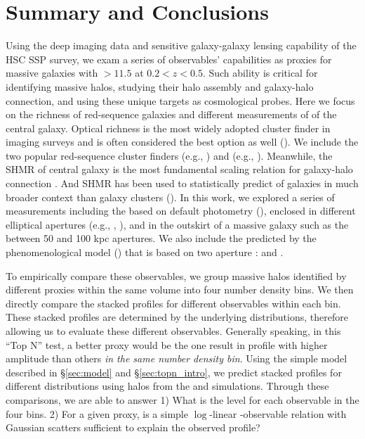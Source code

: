 \documentclass[fleqn,usenatbib,useAMS,english]{mnras}
\begin{document}
\section{Summary and Conclusions}
    \label{sec:summary}

    Using the deep imaging data and sensitive galaxy-galaxy lensing capability of the HSC SSP
    survey, we exam a series of observables' capabilities as \mvir{} proxies for massive
    galaxies with \logms{}$>11.5$ at $0.2 < z < 0.5$.
    Such ability is critical for identifying massive halos, studying their halo assembly and
    galaxy-halo connection, and using these unique targets as cosmological probes.
    Here we focus on the richness of red-sequence galaxies and different measurements of \mstar{}
    of the central galaxy.
    Optical richness is the most widely adopted cluster finder in imaging surveys and is often
    considered the best option as well (\addref{}).
    We include the two popular red-sequence cluster finders \redm{} (e.g., \addref{}) and
    \camira{} (e.g., \addref{}).
    Meanwhile, the SHMR of central galaxy is the most fundamental scaling relation for
    galaxy-halo connection \citep[e.g.,][]{Wechsler2018}.
    And SHMR has been used to statistically predict \mvir{} of galaxies in much broader
    context than galaxy clusters (\addref{}).
    In this work, we explored a series of \mstar{} measurements including the \mstar{}
    based on default \cmodel{} photometry (\mcmodel{}), \mstar{} enclosed in different
    elliptical apertures (e.g., , ), and \mstar{} in the outskirt of a
    massive galaxy such as the \mstar{} between 50 and 100 kpc apertures.
    We also include the \mvir{} predicted by the phenomenological model \asap{}
    (\citealt{Huang2020}) that is based on two aperture \mstar{}:  and \mmax{}.

    To empirically compare these observables, we group massive halos identified by different
    proxies within the same volume into four number density bins.
    We then directly compare the stacked \dsigma{} profiles for different observables within
    each bin.
    These stacked \dsigma{} profiles are determined by the underlying \mvir{} distributions,
    therefore allowing us to evaluate these different observables.
    Generally speaking, in this ``Top N'' test, a better \mvir{} proxy would be the one result
    in \dsigma{} profile with higher amplitude than others \emph{in the same number density bin}.
    Using the simple model described in \S \ref{sec:model} and \S \ref{sec:topn_intro}, we
    predict stacked \dsigma{} profiles for different \mvir{} distributions using halos from
    the  and \smdpl{} simulations.
    Through these comparisons, we are able to answer
    1) What is the \sigmh{} level for each observable in the four bins.
    2) For a given \mvir{} proxy, is a simple $\log$-linear \mvir{}-observable relation with
    Gaussian scatters sufficient to explain the observed \dsigma{} profile?
\end{document}
